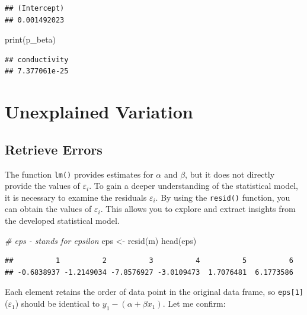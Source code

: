 \documentclass[
]{book}
\newenvironment{Shaded}{\begin{snugshade}}{\end{snugshade}}
\newcommand{\CommentTok}[1]{\textcolor[rgb]{0.56,0.35,0.01}{\textit{#1}}}
\newcommand{\FunctionTok}[1]{\textcolor[rgb]{0.00,0.00,0.00}{#1}}
\newcommand{\NormalTok}[1]{#1}
\newcommand{\OtherTok}[1]{\textcolor[rgb]{0.56,0.35,0.01}{#1}}
\begin{document}
\begin{verbatim}
## (Intercept) 
## 0.001492023
\end{verbatim}

\begin{Shaded}
\begin{Highlighting}[]
\FunctionTok{print}\NormalTok{(p\_beta)}
\end{Highlighting}
\end{Shaded}

\begin{verbatim}
## conductivity 
## 7.377061e-25
\end{verbatim}

\hypertarget{unexplained-variation}{%
\section{Unexplained Variation}\label{unexplained-variation}}

\hypertarget{retrieve-errors}{%
\subsection{Retrieve Errors}\label{retrieve-errors}}

The function \texttt{lm()} provides estimates for \(\alpha\) and \(\beta\), but it does not directly provide the values of \(\varepsilon_i\). To gain a deeper understanding of the statistical model, it is necessary to examine the residuals \(\varepsilon_i\). By using the \texttt{resid()} function, you can obtain the values of \(\varepsilon_i\). This allows you to explore and extract insights from the developed statistical model.

\begin{Shaded}
\begin{Highlighting}[]
\CommentTok{\# eps {-} stands for epsilon}
\NormalTok{eps }\OtherTok{\textless{}{-}} \FunctionTok{resid}\NormalTok{(m)}
\FunctionTok{head}\NormalTok{(eps)}
\end{Highlighting}
\end{Shaded}

\begin{verbatim}
##          1          2          3          4          5          6 
## -0.6838937 -1.2149034 -7.8576927 -3.0109473  1.7076481  6.1773586
\end{verbatim}

Each element retains the order of data point in the original data frame, so \texttt{eps{[}1{]}} (\(\varepsilon_1\)) should be identical to \(y_1 - (\alpha + \beta x_1)\). Let me confirm:
\end{document}

